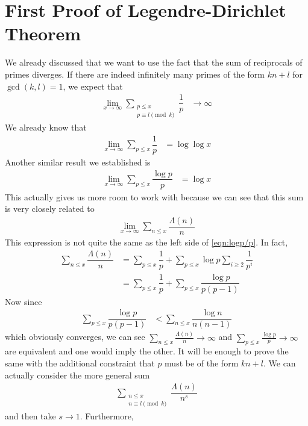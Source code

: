 \documentclass[elemannt.tex]{subfile}
\begin{document}
	\section{First Proof of Legendre-Dirichlet Theorem}
	We already discussed that we want to use the fact that the sum of reciprocals of primes diverges. If there are indeed infinitely many primes of the form $kn+l$ for $\gcd(k,l)=1$, we expect that
		\begin{align*}
			\lim_{x\to\infty}\sum_{\substack{p\leq x\\p\equiv l\pmod{k}}}\dfrac{1}{p}
				& \to\infty
		\end{align*}
	We already know that
		\begin{align*}
			\lim_{x\to\infty}\sum_{p\leq x}\dfrac{1}{p}
				& = \log{\log{x}}
		\end{align*}
	Another similar result we established is
		\begin{align}
			\lim_{x\to\infty}\sum_{p\leq x}\dfrac{\log{p}}{p}
			& = \log{x}\label{eqn:logp/p}
		\end{align}
	This actually gives us more room to work with because we can see that this sum is very closely related to
		\begin{align*}
			\lim_{x\to\infty}\sum_{n\leq x}\dfrac{\Lambda(n)}{n}
		\end{align*}
	This expression is not quite the same as the left side of \eqref{eqn:logp/p}. In fact,
		\begin{align*}
			\sum_{n\leq x}\dfrac{\Lambda(n)}{n}
				& = \sum_{p\leq x}\dfrac{1}{p}+\sum_{p\leq x}\log{p}\sum_{i\geq2}\dfrac{1}{p^{i}}\\
				& = \sum_{p\leq x}\dfrac{1}{p}+\sum_{p\leq x}\dfrac{\log{p}}{p(p-1)}
		\end{align*}
	Now since
		\begin{align*}
			\sum_{p\leq x}\dfrac{\log{p}}{p(p-1)} & < \sum_{n\leq x}\dfrac{\log{n}}{n(n-1)}
		\end{align*}
	which obviously converges, we can see $\sum_{n\leq x}\frac{\Lambda(n)}{n}\to\infty$ and $\sum_{p\leq x}\frac{\log{p}}{p}\to\infty$ are equivalent and one would imply the other. It will be enough to prove the same with the additional constraint that $p$ must be of the form $kn+l$. We can actually consider the more general sum
		\begin{align*}
			\sum_{\substack{n\leq x\\n\equiv l\pmod{k}}}\dfrac{\Lambda(n)}{n^{s}}
		\end{align*}
	and then take $s\to1$. Furthermore,
\end{document}
